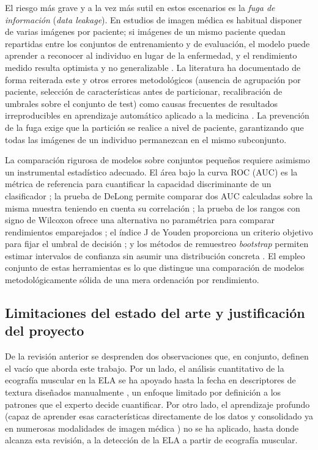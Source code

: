 \documentclass[12pt]{extarticle}
\numberwithin{equation}{section}
\begin{document}
\begin{refsection}
El riesgo más grave y a la vez más sutil en estos escenarios es la \textit{fuga de información} (\textit{data leakage}). En estudios de imagen médica es habitual disponer de varias imágenes por paciente; si imágenes de un mismo paciente quedan repartidas entre los conjuntos de entrenamiento y de evaluación, el modelo puede aprender a reconocer al individuo en lugar de la enfermedad, y el rendimiento medido resulta optimista y no generalizable \cite{saeb2017need}. La literatura ha documentado de forma reiterada este y otros errores metodológicos (ausencia de agrupación por paciente, selección de características antes de particionar, recalibración de umbrales sobre el conjunto de test) como causas frecuentes de resultados irreproducibles en aprendizaje automático aplicado a la medicina \cite{roberts2021common}. La prevención de la fuga exige que la partición se realice a nivel de paciente, garantizando que todas las imágenes de un individuo permanezcan en el mismo subconjunto.

La comparación rigurosa de modelos sobre conjuntos pequeños requiere asimismo un instrumental estadístico adecuado. El área bajo la curva ROC (AUC) es la métrica de referencia para cuantificar la capacidad discriminante de un clasificador \cite{hanley1982meaning}; la prueba de DeLong permite comparar dos AUC calculadas sobre la misma muestra teniendo en cuenta su correlación \cite{delong1988comparing}; la prueba de los rangos con signo de Wilcoxon ofrece una alternativa no paramétrica para comparar rendimientos emparejados \cite{wilcoxon1945individual}; el índice J de Youden proporciona un criterio objetivo para fijar el umbral de decisión \cite{youden1950index}; y los métodos de remuestreo \textit{bootstrap} permiten estimar intervalos de confianza sin asumir una distribución concreta \cite{efron1979bootstrap,efron1993introduction}. El empleo conjunto de estas herramientas es lo que distingue una comparación de modelos metodológicamente sólida de una mera ordenación por rendimiento.

\subsection{Limitaciones del estado del arte y justificación del proyecto}\label{subsec:gap}

De la revisión anterior se desprenden dos observaciones que, en conjunto, definen el vacío que aborda este trabajo. Por un lado, el análisis cuantitativo de la ecografía muscular en la ELA se ha apoyado hasta la fecha en descriptores de textura diseñados manualmente \cite{martinezpaya2017quantitative,martinezpaya2018monitoring}, un enfoque limitado por definición a los patrones que el experto decide cuantificar. Por otro lado, el aprendizaje profundo (capaz de aprender esas características directamente de los datos y consolidado ya en numerosas modalidades de imagen médica \cite{litjens2017survey,shen2017deep}) no se ha aplicado, hasta donde alcanza esta revisión, a la detección de la ELA a partir de ecografía muscular.


\end{refsection}
\end{document}
